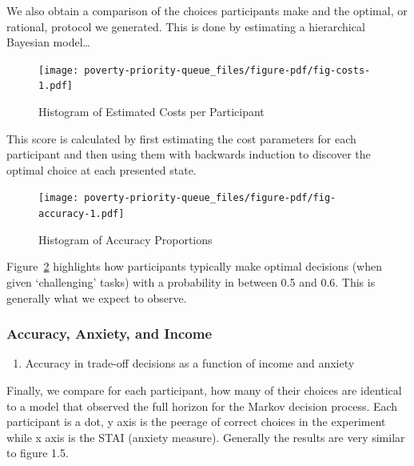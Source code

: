 \documentclass[
]{report}
\providecommand{\tightlist}{%
  \setlength{\itemsep}{0pt}\setlength{\parskip}{0pt}}\usepackage{longtable,booktabs,array}
\begin{document}
We also obtain a comparison of the choices participants make and the
optimal, or rational, protocol we generated. This is done by estimating
a hierarchical Bayesian model\ldots{}

\begin{figure}

{\centering \texttt{[image: poverty-priority-queue\_files/figure-pdf/fig-costs-1.pdf]}

}

\caption{\label{fig-costs}Histogram of Estimated Costs per Participant}

\end{figure}

This score is calculated by first estimating the cost parameters for
each participant and then using them with backwards induction to
discover the optimal choice at each presented state.

\begin{figure}

{\centering \texttt{[image: poverty-priority-queue\_files/figure-pdf/fig-accuracy-1.pdf]}

}

\caption{\label{fig-accuracy}Histogram of Accuracy Proportions}

\end{figure}

Figure~\ref{fig-accuracy} highlights how participants typically make
optimal decisions (when given `challenging' tasks) with a probability in
between 0.5 and 0.6. This is generally what we expect to observe.

\hypertarget{accuracy-anxiety-and-income}{%
\subsubsection{Accuracy, Anxiety, and
Income}\label{accuracy-anxiety-and-income}}

\begin{enumerate}
\def\labelenumi{\arabic{enumi}.}
\tightlist
\item
  Accuracy in trade-off decisions as a function of income and anxiety
\end{enumerate}

Finally, we compare for each participant, how many of their choices are
identical to a model that observed the full horizon for the Markov
decision process. Each participant is a dot, y axis is the peerage of
correct choices in the experiment while x axis is the STAI (anxiety
measure). Generally the results are very similar to figure 1.5.
\end{document}

